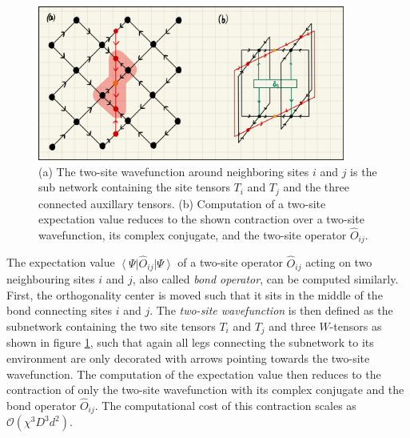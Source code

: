 \begin{figure}
	\centering
	\includegraphics[width=0.9\textwidth]{figures/Tensor_Networks/disoTPS_twosite_expectation_value.jpeg}
	\caption{(a) The two-site wavefunction around neighboring sites $i$ and $j$ is the sub network containing the site tensors $T_i$ and $T_j$ and the three connected auxillary tensors. (b) Computation of a two-site expectation value reduces to the shown contraction over a two-site wavefunction, its complex conjugate, and the two-site operator $\hat{O}_{ij}$.}
	\label{fig:disoTPS_twosite_expectation_value}
\end{figure}
The expectation value $\left\langle\Psi\right|\hat{O}_{ij}\left|\Psi\right\rangle$ of a two-site operator $\hat{O}_{ij}$ acting on two neighbouring sites $i$ and $j$, also called \textit{bond operator}, can be computed similarly. First, the orthogonality center is moved such that it sits in the middle of the bond connecting sites $i$ and $j$. The \textit{two-site wavefunction} is then defined as the subnetwork containing the two site tensors $T_i$ and $T_j$ and three $W$-tensors as shown in figure \ref{fig:disoTPS_twosite_expectation_value}, such that again all legs connecting the subnetwork to its environment are only decorated with arrows pointing towards the two-site wavefunction. The computation of the expectation value then reduces to the contraction of only the two-site wavefunction with its complex conjugate and the bond operator $\hat{O}_{ij}$. The computational cost of this contraction scales as $\mathcal{O}\left(\chi^3D^3d^2\right)$.